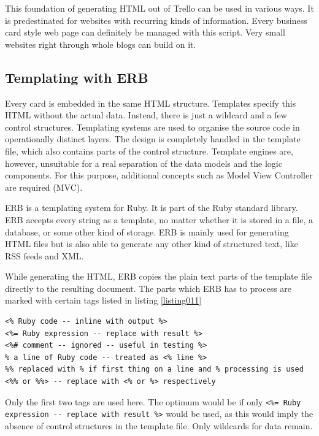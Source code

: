 This foundation of generating HTML out of Trello can be used in various ways. It is predestinated for websites with recurring kinds of information. Every business card style web page can definitely be managed with this script. Very small websites right through whole blogs can build on it.

\subsection{Templating with ERB}
Every card is embedded in the same HTML structure. Templates specify this HTML without the actual data. Instead, there is just a wildcard and a few control structures. Templating systems are used to organise the source code in operationally distinct layers. The design is completely handled in the template file, which also contains parts of the control structure. Template engines are, however, unsuitable for a real separation of the data models and the logic components. For this purpose, additional concepts such as Model View Controller are required (MVC).

ERB is a templating system for Ruby. It is part of the Ruby standard library. ERB accepts every string as a template, no matter whether it is stored in a file, a database, or some other kind of storage. ERB is mainly used for generating HTML files but is also able to generate any other kind of structured text, like RSS feeds and XML. \cite{erb:introduction} \cite{erb:docu}

While generating the HTML, ERB copies the plain text parts of the template file directly to the resulting document.  The parts which ERB has to process are marked with certain tags listed in listing \ref{listing011}
\begin{lstlisting}[aboveskip=1\baselineskip, style=bash, caption=Recognised tags in ERB., label=listing011]
<% Ruby code -- inline with output %>
<%= Ruby expression -- replace with result %>
<%# comment -- ignored -- useful in testing %>
% a line of Ruby code -- treated as <% line %> 
%% replaced with % if first thing on a line and % processing is used
<%% or %%> -- replace with <% or %> respectively
\end{lstlisting}
Only the first two tags are used here. The optimum would be if only \lstinline{<%= Ruby expression -- replace with result %>} would be used, as this would imply the absence of control structures in the template file. Only wildcards for data remain.

